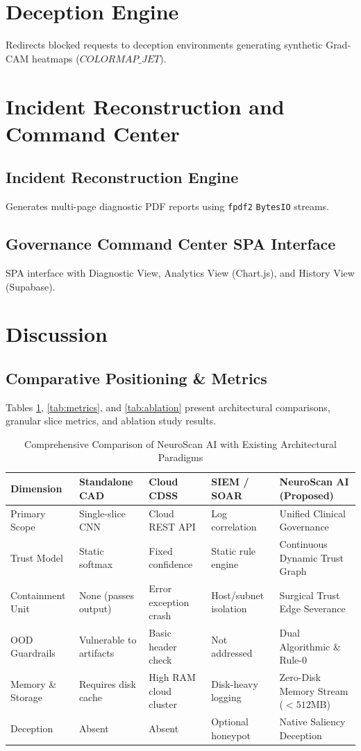 \documentclass[conference]{IEEEtran}
\begin{document}
\section{Deception Engine}
Redirects blocked requests to deception environments generating synthetic Grad-CAM heatmaps ($COLORMAP\_JET$).

\section{Incident Reconstruction and Command Center}
\subsection{Incident Reconstruction Engine}
Generates multi-page diagnostic PDF reports using \texttt{fpdf2} \texttt{BytesIO} streams.

\subsection{Governance Command Center SPA Interface}
SPA interface with Diagnostic View, Analytics View (Chart.js), and History View (Supabase).

\section{Discussion}
\subsection{Comparative Positioning \& Metrics}
Tables \ref{tab:comparison}, \ref{tab:metrics}, and \ref{tab:ablation} present architectural comparisons, granular slice metrics, and ablation study results.

\begin{table}[t]
\caption{Comprehensive Comparison of NeuroScan AI with Existing Architectural Paradigms}
\label{tab:comparison}
\centering
\begin{tabular}{lllll}
\toprule
\textbf{Dimension} & \textbf{Standalone CAD \cite{deepak2019}} & \textbf{Cloud CDSS \cite{yatsenko2023}} & \textbf{SIEM / SOAR \cite{gonzalez2021}} & \textbf{NeuroScan AI (Proposed)} \\
\midrule
Primary Scope & Single-slice CNN & Cloud REST API & Log correlation & Unified Clinical Governance \\
Trust Model & Static softmax & Fixed confidence & Static rule engine & Continuous Dynamic Trust Graph \\
Containment Unit & None (passes output) & Error exception crash & Host/subnet isolation & Surgical Trust Edge Severance \\
OOD Guardrails & Vulnerable to artifacts & Basic header check & Not addressed & Dual Algorithmic \& Rule-0 \\
Memory \& Storage & Requires disk cache & High RAM cloud cluster & Disk-heavy logging & Zero-Disk Memory Stream ($<512$MB) \\
Deception & Absent & Absent & Optional honeypot & Native Saliency Deception \\
\bottomrule
\end{tabular}
\end{table}
\end{document}
